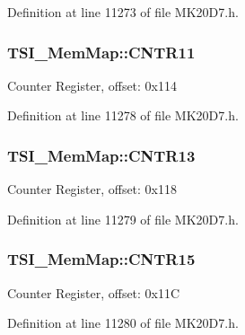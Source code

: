 Definition at line 11273 of file M\+K20\+D7.\+h.

\subsubsection[{\texorpdfstring{C\+N\+T\+R11}{CNTR11}}]{ T\+S\+I\+\_\+\+Mem\+Map\+::\+C\+N\+T\+R11}\hypertarget{struct_t_s_i___mem_map_a73d4134257f7351180c72870359b2bbf}{}\label{struct_t_s_i___mem_map_a73d4134257f7351180c72870359b2bbf}
Counter Register, offset\+: 0x114 

Definition at line 11278 of file M\+K20\+D7.\+h.

\subsubsection[{\texorpdfstring{C\+N\+T\+R13}{CNTR13}}]{ T\+S\+I\+\_\+\+Mem\+Map\+::\+C\+N\+T\+R13}\hypertarget{struct_t_s_i___mem_map_aa09add648d77175d86d87c2d3533af74}{}\label{struct_t_s_i___mem_map_aa09add648d77175d86d87c2d3533af74}
Counter Register, offset\+: 0x118 

Definition at line 11279 of file M\+K20\+D7.\+h.

\subsubsection[{\texorpdfstring{C\+N\+T\+R15}{CNTR15}}]{ T\+S\+I\+\_\+\+Mem\+Map\+::\+C\+N\+T\+R15}\hypertarget{struct_t_s_i___mem_map_aada5f006d1b63bfb573ec56cdf21e4bc}{}\label{struct_t_s_i___mem_map_aada5f006d1b63bfb573ec56cdf21e4bc}
Counter Register, offset\+: 0x11C 

Definition at line 11280 of file M\+K20\+D7.\+h.

